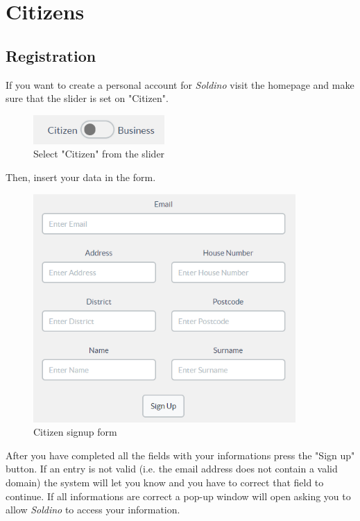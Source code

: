 \section{Citizens}
	\subsection{Registration}
	If you want to create a personal account for \textit{Soldino} visit the
	homepage and make sure that the slider is set on "Citizen".\\
	\begin{figure}[H]
		\includegraphics[width=5cm]{res/images/user_citizen.png}
		\centering
		\caption{Select "Citizen" from the slider}
	\end{figure}	
	\noindent Then, insert your data in the form. 
	\begin{figure}[H]
		\includegraphics[width=10cm]{res/images/citizen_signup.png}
		\centering
		\caption{Citizen signup form}
	\end{figure}
	\noindent After you have completed all the
	fields with your informations press the "Sign up" button. If an entry 
	is not valid (i.e. the email address does not contain a valid domain) 
	the system will let you know and you have to correct that field to continue.
	If all informations are correct a pop-up window will open asking you 
	to allow \textit{Soldino} to access your information.\\
